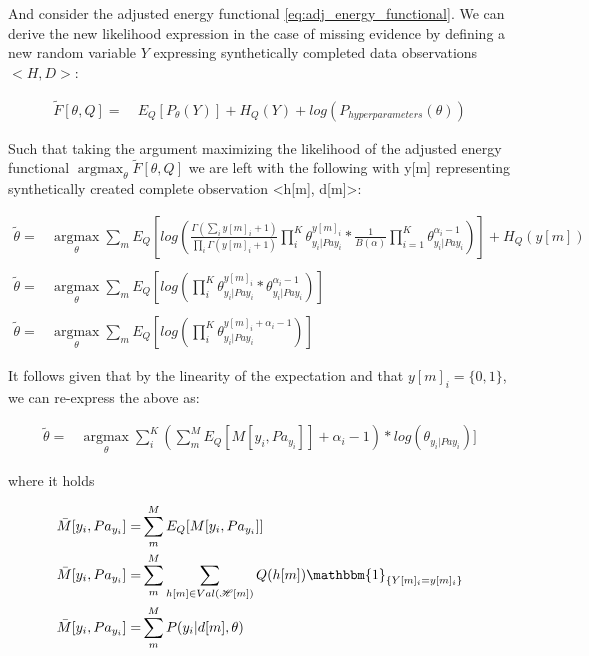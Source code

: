 \documentclass[11pt]{article}
\begin{document}
\begin{article}
And consider the adjusted energy functional
\ref{eq:adj_energy_functional}. We can derive the new likelihood
expression in the case of missing evidence by defining a new
random variable \(Y\) expressing synthetically completed data observations \(<H,
    D>\):

\begin{align} \label{eq:dirichlet-multinomial-likelihood}
\tilde{F}[\theta, Q] =& \ E_Q[P_\theta(Y)] + H_Q (Y) + log(P_{hyperparameters}(\theta))
\end{align}

Such that taking the argument maximizing the likelihood of the
adjusted energy functional \(\operatorname*{argmax}_{\theta}
    \tilde{F}[\theta, Q]\) we are left with the following with y[m]
representing synthetically created complete observation <h[m],
d[m]>:

\begin{align} \label{eq:first-order-condition}
\tilde{\theta} =& \operatorname*{argmax}_{\theta} \sum_m E_Q[log(\frac{\Gamma(\sum_i y[m]_i + 1)}{\prod_i \Gamma(y[m]_i + 1)} \prod_i^K \theta_{y_i | Pa{y_i}}^{y[m]_i} * \frac{1}{B(\alpha)} \prod_{i=1}^K \theta_{y_i | Pa{y_i}}^{\alpha_i - 1})] + H_Q (y[m]) \\
\nonumber\\   
\tilde{\theta} =& \operatorname*{argmax}_{\theta} \sum_m E_Q[log(\prod_i^K \theta_{y_i | Pa{y_i}}^{y[m]_i} * \theta_{y_i | Pa{y_i}}^{\alpha_i - 1})]\\
\nonumber\\   
\tilde{\theta} =& \operatorname*{argmax}_{\theta} \sum_m E_Q[log(\prod_i^K \theta_{y_i | Pa{y_i}}^{y[m]_i + \alpha_i - 1})] 
\end{align}

It follows given that by the linearity of the expectation and that
\(y[m]_i = \{0,1\}\), we can re-express the above as:

\begin{align} \label{eq:solution1}
\tilde{\theta} =& \operatorname*{argmax}_{\theta} \sum_i^K (\sum_m^M E_Q[M[y_i, Pa_{y_i}]] + \alpha_i - 1) * log(\theta_{y_i | Pa{y_i}})] 
\end{align}

where it holds

\begin{align} \label{eq:expected_sufficient}
\bar{M}[y_i, Pa_{y_i}]  =& \sum_m^M E_Q[M[y_i, Pa_{y_i}]]\\
\bar{M}[y_i, Pa_{y_i}]  =& \sum_m^M \sum_{h[m] \in Val(\mathscr{H}[m])} Q(h[m]) \mathbbm{1}_{\{Y[m]_i = y[m]_i\}}\\
\bar{M}[y_i, Pa_{y_i}]  =& \sum_m^M P(y_i | d[m], \theta)
\end{align}


\end{article}
\end{document}
